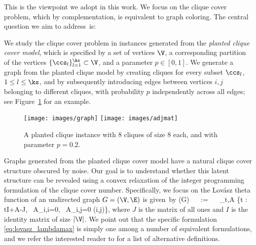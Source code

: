 This is the viewpoint we adopt in this work.  We focus on the clique cover problem, which by complementation, is equivalent to graph coloring.  The central question we aim to address~is:

 \medskip
  \begin{center}
\parbox[c]{400pt}{}
\end{center}
 



We study the clique cover problem  in instances generated from the 
  {\em planted clique cover model}, which is  specified by a set of vertices $\V$, a corresponding partition of the vertices $\{\ccs_l\}_{l=1}^{\ks} \subset \V$, and a parameter $p \in [0,1]$.  We generate a graph from the planted clique model by creating cliques for every subset $\ccs_l$, $1 \leq l \leq \ks$, and by subsequently introducing edges between vertices $i,j$ belonging to different cliques, with probability $p$ independently across all edges; see Figure~\ref{cluster} for an example.   

\begin{figure}[h]\label{cluster}
	\centering
     \texttt{[image: images/graph]}
     \texttt{[image: images/adjmat]}
     \caption{A planted clique instance with $8$ cliques of size $8$ each, and with parameter $p=0.2$.}
\end{figure}

Graphs generated from the planted clique cover model have a natural clique cover structure obscured by noise. Our goal  is to understand whether  this latent structure    can be revealed using a convex relaxation of the  integer programming formulation of the clique cover number. 
Specifically, we focus on the Lov\'asz theta function of an undirected graph $G=(\V,\E)$ is given~by
\beq{} \label{eq:lovasz_lambdamax}
\lt(G) ~~ := ~~ \min_{t,A} \Big\{t : tI+A-J, \ A_{i,i}=0, \ A_{i,j}=0  (i,j)\not \in \E \Big\},
\eeq
where $J$ is the matrix of all ones and $I$ is the identity matrix of size $|\V|$. 
We point out that the specific formulation \eqref{eq:lovasz_lambdamax} is simply one among a number of equivalent formulations, and we refer the interested reader to \cite{knuth} for a list of alternative definitions.  
 
